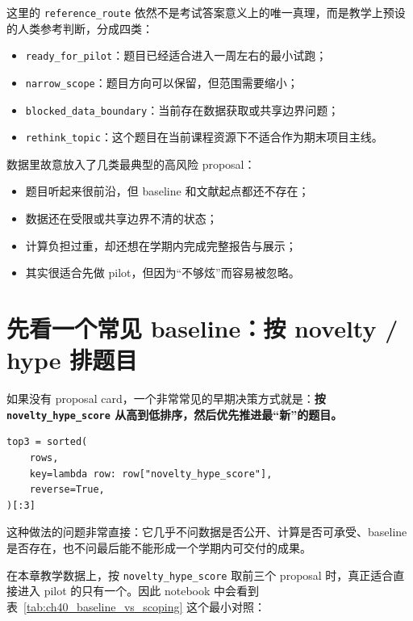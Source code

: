 这里的 \texttt{reference\_route} 依然不是考试答案意义上的唯一真理，而是教学上预设的人类参考判断，分成四类：

\begin{itemize}
    \item \texttt{ready\_for\_pilot}：题目已经适合进入一周左右的最小试跑；
    \item \texttt{narrow\_scope}：题目方向可以保留，但范围需要缩小；
    \item \texttt{blocked\_data\_boundary}：当前存在数据获取或共享边界问题；
    \item \texttt{rethink\_topic}：这个题目在当前课程资源下不适合作为期末项目主线。
\end{itemize}

数据里故意放入了几类最典型的高风险 proposal：

\begin{itemize}
    \item 题目听起来很前沿，但 baseline 和文献起点都还不存在；
    \item 数据还在受限或共享边界不清的状态；
    \item 计算负担过重，却还想在学期内完成完整报告与展示；
    \item 其实很适合先做 pilot，但因为“不够炫”而容易被忽略。
\end{itemize}

\section{先看一个常见 baseline：按 novelty / hype 排题目}

如果没有 proposal card，一个非常常见的早期决策方式就是：\textbf{按 \texttt{novelty\_hype\_score} 从高到低排序，然后优先推进最“新”的题目。}

\begin{examplebox}
\begin{lstlisting}[style=pythonstyle]
top3 = sorted(
    rows,
    key=lambda row: row["novelty_hype_score"],
    reverse=True,
)[:3]
\end{lstlisting}
\end{examplebox}

这种做法的问题非常直接：它几乎不问数据是否公开、计算是否可承受、baseline 是否存在，也不问最后能不能形成一个学期内可交付的成果。

在本章教学数据上，按 \texttt{novelty\_hype\_score} 取前三个 proposal 时，真正适合直接进入 pilot 的只有一个。因此 notebook 中会看到表~\ref{tab:ch40_baseline_vs_scoping} 这个最小对照：

